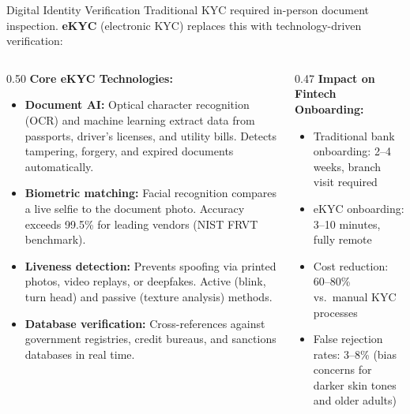 \begin{frame}{Digital Identity Verification}
  Traditional KYC required in-person document inspection. \textbf{eKYC}
  (electronic KYC) replaces this with technology-driven verification:

  \vspace{0.5em}
  \begin{columns}[T]
    \begin{column}{0.50\textwidth}
      \textcolor{mlpurple}{\textbf{Core eKYC Technologies:}}
      \begin{itemize}
        \item \textbf{Document AI:} Optical character recognition (OCR) and
              machine learning extract data from passports, driver's licenses,
              and utility bills. Detects tampering, forgery, and expired
              documents automatically.
        \item \textbf{Biometric matching:} Facial recognition compares a live
              selfie to the document photo. Accuracy exceeds 99.5\% for
              leading vendors (NIST FRVT benchmark).
        \item \textbf{Liveness detection:} Prevents spoofing via printed photos,
              video replays, or deepfakes. Active (blink, turn head) and
              passive (texture analysis) methods.
        \item \textbf{Database verification:} Cross-references against
              government registries, credit bureaus, and sanctions databases
              in real time.
      \end{itemize}
    \end{column}
    \begin{column}{0.47\textwidth}
      \textcolor{mlpurple}{\textbf{Impact on Fintech Onboarding:}}

      \vspace{0.5em}
      \begin{itemize}
        \item Traditional bank onboarding: 2--4 weeks, branch visit required
        \item eKYC onboarding: 3--10 minutes, fully remote
        \item Cost reduction: 60--80\% vs.\ manual KYC processes
        \item False rejection rates: 3--8\% (bias concerns for darker skin
              tones and older adults)
      \end{itemize}


\end{column}
\end{columns}
\end{frame}
